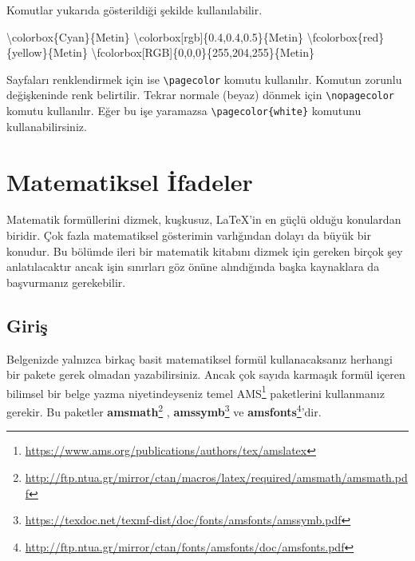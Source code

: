 \documentclass[
  10pt,
]{scrbook}
\newenvironment{Shaded}{}{}
\newcommand{\FunctionTok}[1]{\textcolor[rgb]{0.02,0.16,0.49}{#1}}
\newcommand{\NormalTok}[1]{#1}
\renewcommand{\href}[2]{#2\footnote{\url{#1}}}
\theoremstyle{definition}
\theoremstyle{definition}
\theoremstyle{definition}
\theoremstyle{definition}
\theoremstyle{remark}
\begin{document}
Komutlar yukarıda gösterildiği şekilde kullanılabilir.

\begin{Shaded}
\begin{Highlighting}[]
\FunctionTok{\textbackslash{}colorbox}\NormalTok{\{Cyan\}\{Metin\}}
\FunctionTok{\textbackslash{}colorbox}\NormalTok{[rgb]\{0.4,0.4,0.5\}\{Metin\}}
\FunctionTok{\textbackslash{}fcolorbox}\NormalTok{\{red\}\{yellow\}\{Metin\}}
\FunctionTok{\textbackslash{}fcolorbox}\NormalTok{[RGB]\{0,0,0\}\{255,204,255\}\{Metin\}}
\end{Highlighting}
\end{Shaded}

Sayfaları renklendirmek için ise \texttt{\textbackslash{}pagecolor} komutu kullanılır. Komutun zorunlu değişkeninde renk belirtilir. Tekrar normale (beyaz) dönmek için \texttt{\textbackslash{}nopagecolor} komutu kullanılır. Eğer bu işe yaramazsa \texttt{\textbackslash{}pagecolor\{white\}} komutunu kullanabilirsiniz.

\hypertarget{matematiksel-ifadeler}{%
\chapter{Matematiksel İfadeler}\label{matematiksel-ifadeler}}

Matematik formüllerini dizmek, kuşkusuz, LaTeX'in en güçlü olduğu konulardan biridir. Çok fazla matematiksel gösterimin varlığından dolayı da büyük bir konudur. Bu bölümde ileri bir matematik kitabını dizmek için gereken birçok şey anlatılacaktır ancak işin sınırları göz önüne alındığında başka kaynaklara da başvurmanız gerekebilir.

\hypertarget{giriux15f-1}{%
\section{Giriş}\label{giriux15f-1}}

Belgenizde yalnızca birkaç basit matematiksel formül kullanacaksanız herhangi bir pakete gerek olmadan yazabilirsiniz. Ancak çok sayıda karmaşık formül içeren bilimsel bir belge yazma niyetindeyseniz temel \href{https://www.ams.org/publications/authors/tex/amslatex}{AMS} paketlerini kullanmanız gerekir. Bu paketler \href{http://ftp.ntua.gr/mirror/ctan/macros/latex/required/amsmath/amsmath.pdf}{\textbf{amsmath}} , \href{https://texdoc.net/texmf-dist/doc/fonts/amsfonts/amssymb.pdf}{\textbf{amssymb}} ve \href{http://ftp.ntua.gr/mirror/ctan/fonts/amsfonts/doc/amsfonts.pdf}{\textbf{amsfonts}}'dir.
\end{document}

